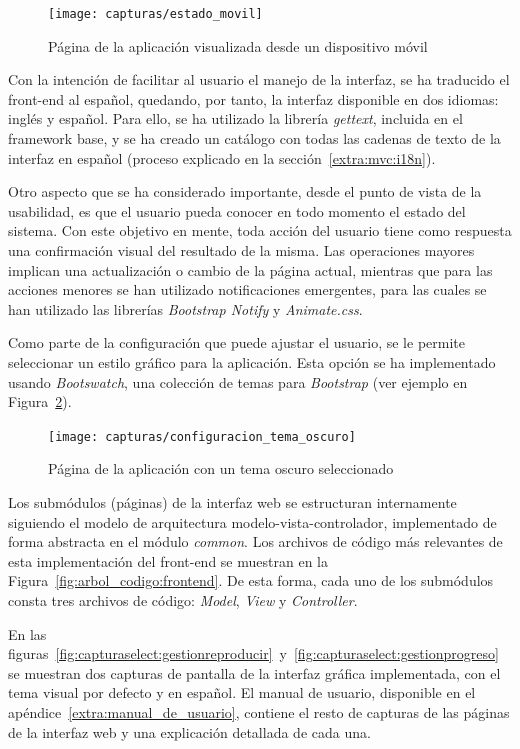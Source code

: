 \begin{figure}[!htp]
  \centering
  \texttt{[image: capturas/estado\_movil]}
  \caption{Página de la aplicación visualizada desde un dispositivo móvil}
  \label{fig:captura:movil}
\end{figure}

Con la intención de facilitar al usuario el manejo de la interfaz, se ha traducido el \gls{front-end} al español, quedando, por tanto, la interfaz disponible en dos idiomas: inglés y español.
Para ello, se ha utilizado la librería \textit{gettext}, incluida en el \gls{framework} base, y se ha creado un catálogo con todas las cadenas de texto de la interfaz en español (proceso explicado en la sección~\ref{extra:mvc:i18n}).

Otro aspecto que se ha considerado importante, desde el punto de vista de la usabilidad, es que el usuario pueda conocer en todo momento el estado del sistema.
Con este objetivo en mente, toda acción del usuario tiene como respuesta una confirmación visual del resultado de la misma.
Las operaciones mayores implican una actualización o cambio de la página actual, mientras que para las acciones menores se han utilizado notificaciones emergentes, para las cuales se han utilizado las librerías \textit{Bootstrap Notify} y \textit{Animate.css}.

Como parte de la configuración que puede ajustar el usuario, se le permite seleccionar un estilo gráfico para la aplicación.
Esta opción se ha implementado usando \textit{Bootswatch}, una colección de temas para \textit{Bootstrap} (ver ejemplo en Figura~\ref{fig:captura:oscuro}).

\begin{figure}[!htp]
  \centering
  \texttt{[image: capturas/configuracion\_tema\_oscuro]}
  \caption{Página de la aplicación con un tema oscuro seleccionado}
  \label{fig:captura:oscuro}
\end{figure}

Los submódulos (páginas) de la interfaz web se estructuran internamente siguiendo el modelo de arquitectura modelo-vista-controlador, implementado de forma abstracta en el módulo \textit{common}.
Los archivos de código más relevantes de esta implementación del \gls{front-end} se muestran en la Figura~\ref{fig:arbol_codigo:frontend}.
De esta forma, cada uno de los submódulos consta tres archivos de código: \textit{Model}, \textit{View} y \textit{Controller}.

En las figuras~\ref{fig:capturaselect:gestionreproducir}~y~\ref{fig:capturaselect:gestionprogreso} se muestran dos capturas de pantalla de la interfaz gráfica implementada, con el tema visual por defecto y en español.
El manual de usuario, disponible en el apéndice~\ref{extra:manual_de_usuario}, contiene el resto de capturas de las páginas de la interfaz web y una explicación detallada de cada una.

